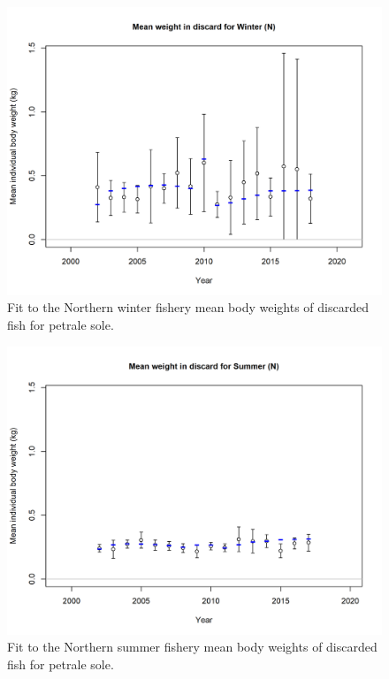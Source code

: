 \documentclass[12pt,]{article}
\begin{document}
\FloatBarrier

\begin{figure}
\centering
\includegraphics{r4ss/plots_mod1/bodywt_fit_fltWinter (N).png}
\caption{Fit to the Northern winter fishery mean body weights of
discarded fish for petrale sole. \label{fig:nw_bodywt_fit}}
\end{figure}

\FloatBarrier

\begin{figure}
\centering
\includegraphics{r4ss/plots_mod1/bodywt_fit_fltSummer (N).png}
\caption{Fit to the Northern summer fishery mean body weights of
discarded fish for petrale sole. \label{fig:ns_bodywt_fit}}
\end{figure}
\end{document}
